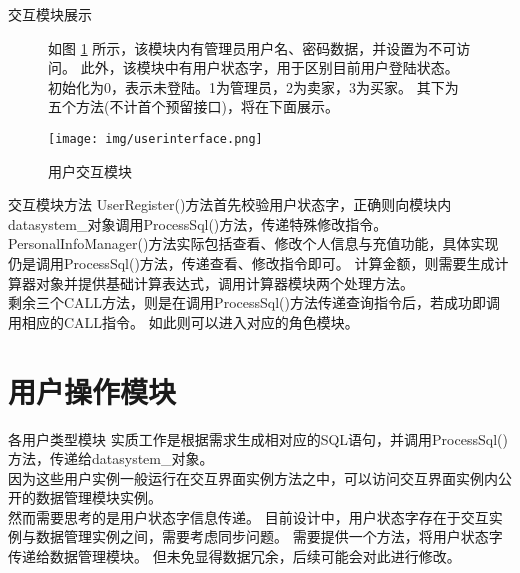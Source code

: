 \documentclass[10pt]{beamer}
\begin{document}
\begin{frame}{交互模块展示}
    \begin{figure}[HTB]
        \begin{minipage}{0.6\textwidth}
            如图 \ref{UserInterface} 所示，该模块内有管理员用户名、密码数据，并设置为不可访问。
            此外，该模块中有用户状态字，用于区别目前用户登陆状态。
            初始化为0，表示未登陆。1为管理员，2为卖家，3为买家。
            其下为五个方法(不计首个预留接口)，将在下面展示。
        \end{minipage}
        \begin{minipage}{0.3\textwidth}
            \centering
            \texttt{[image: img/userinterface.png]}
            \caption{用户交互模块}
            \label{UserInterface}
        \end{minipage}
    \end{figure}
\end{frame}

\begin{frame}{交互模块方法}
    UserRegister()方法首先校验用户状态字，正确则向模块内datasystem\_对象调用ProcessSql()方法，传递特殊修改指令。\\
    PersonalInfoManager()方法实际包括查看、修改个人信息与充值功能，具体实现仍是调用ProcessSql()方法，传递查看、修改指令即可。
    计算金额，则需要生成计算器对象并提供基础计算表达式，调用计算器模块两个处理方法。\\
    剩余三个CALL方法，则是在调用ProcessSql()方法传递查询指令后，若成功即调用相应的CALL指令。
    如此则可以进入对应的角色模块。\\
\end{frame}

\section{用户操作模块}

\begin{frame}{各用户类型模块}
    实质工作是根据需求生成相对应的SQL语句，并调用ProcessSql()方法，传递给datasystem\_对象。\\
    因为这些用户实例一般运行在交互界面实例方法之中，可以访问交互界面实例内公开的数据管理模块实例。\\
    然而需要思考的是用户状态字信息传递。
    目前设计中，用户状态字存在于交互实例与数据管理实例之间，需要考虑同步问题。
    需要提供一个方法，将用户状态字传递给数据管理模块。
    但未免显得数据冗余，后续可能会对此进行修改。\\
\end{frame}
\end{document}
